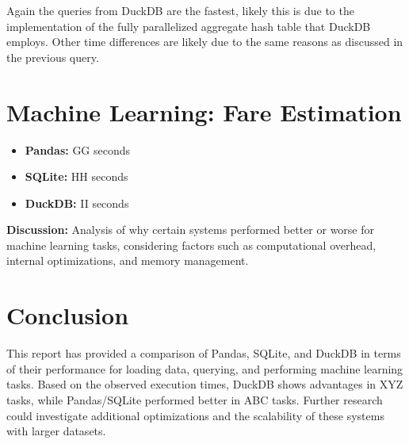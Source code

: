 \documentclass[a4paper,10pt]{article}
\begin{document}
Again the queries from DuckDB are the fastest, likely this is due to the implementation
of the fully parallelized aggregate hash table that DuckDB employs. Other time differences
are likely due to the same reasons as discussed in the previous query.

\section{Machine Learning: Fare Estimation}

\begin{itemize}
  \item \textbf{Pandas:} GG seconds
  \item \textbf{SQLite:} HH seconds
  \item \textbf{DuckDB:} II seconds
\end{itemize}
\textbf{Discussion:} Analysis of why certain systems performed better
or worse for machine learning tasks, considering factors such as
computational overhead, internal optimizations, and memory management.

\section{Conclusion}
This report has provided a comparison of Pandas, SQLite, and DuckDB
in terms of their performance for loading data, querying, and
performing machine learning tasks. Based on the observed execution
times, DuckDB shows advantages in XYZ tasks, while Pandas/SQLite
performed better in ABC tasks. Further research could investigate
additional optimizations and the scalability of these systems with
larger datasets.
\end{document}
